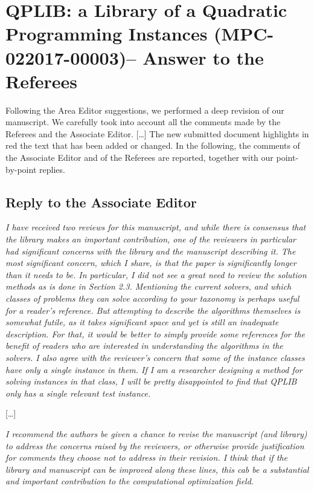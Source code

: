 \documentclass[11pt]{article}
\newcommand{\rep}[1]{{\textcolor{acblue}{#1}}}
\begin{document}
\section*{QPLIB: a Library of a Quadratic Programming Instances (MPC-022017-00003)-- Answer to the Referees}

\rep{
 Following the Area Editor suggestions, we 
 performed a deep revision of our manuscript. We carefully took into account all the comments made by the Referees and the Associate Editor.
 [\dots]
 The new submitted document highlights in red the text that has been
added or changed.
In the following, the comments of the Associate Editor and of the Referees are reported, together with our point-by-point replies.
}


\subsection*{Reply to the Associate Editor}

{\it
I have received two reviews for this manuscript, and while there is consensus that the library makes an important contribution, one of the reviewers in particular had significant concerns with the library and the manuscript describing it. The most significant concern, which I share, is that the paper is significantly longer than it needs to be. In particular, I did not see a great need to review the solution methods as is done in Section 2.3. Mentioning the current solvers, and which classes of problems they can solve according to your taxonomy is perhaps useful for a reader's reference. But attempting to describe the algorithms themselves is somewhat futile, as it takes significant space and yet is still an inadequate description. For that, it would be better to simply provide some references for the benefit of readers who are interested in understanding the algorithms in the solvers. I also agree with the reviewer's concern that some of the instance classes have only a single instance in them. If I am a researcher designing a method for solving instances in that class, I will be pretty disappointed to find that QPLIB only has a single relevant test instance. 
}

\rep{[\dots] }


{\it
I recommend the authors be given a chance to revise the manuscript (and library) to address the concerns raised by the reviewers, or otherwise provide justification for comments they choose not to address in their revision. I think that if the library and manuscript can be improved along these lines, this cab be a substantial and important contribution to the computational optimization field. 
}
\end{document}
